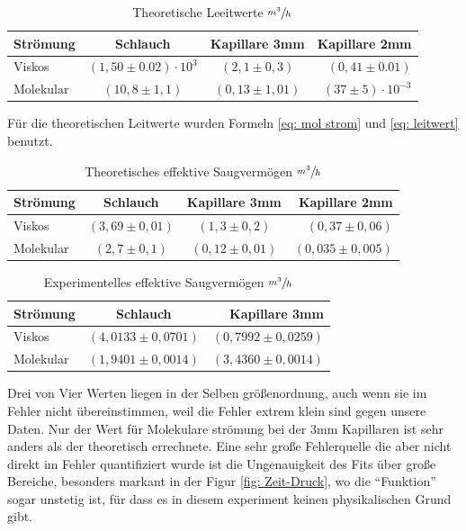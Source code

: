 \documentclass[12pt]{article}
\begin{document}
		\begin{table} [H]
			\begin{center}
				\caption{Theoretische Leeitwerte $\sfrac{m^3}{h}$}
				\begin{tabular}{l|c|c|r}
					\textbf{Strömung } & \textbf{Schlauch}  & \textbf{Kapillare 3mm} & \textbf{Kapillare 2mm}\\
					\hline
					Viskos    &	$(1,50\pm 0.02)\cdot 10^{3} $    & $ (2,1\pm 0,3 )$ & $ (0,41\pm 0.01 )$\\
					Molekular & $ (10,8\pm1,1 )$ & $ (0,13\pm 1,01 )$ & $ (37\pm 5 )\cdot 10^{-3}$\\
				\end{tabular}
			\end{center}
		\end{table}
	Für die theoretischen Leitwerte wurden Formeln \ref{eq: mol strom} und \ref{eq: leitwert} benutzt.
	
		\begin{table} [H]
			\begin{center}
				\caption{Theoretisches effektive Saugvermögen $\sfrac{m^3}{h}$ }
				\begin{tabular}{l|c|c|r}
					\textbf{Strömung } & \textbf{Schlauch}  & \textbf{Kapillare 3mm} & \textbf{Kapillare 2mm}\\
					\hline
					Viskos    &	$( 3,69\pm 0,01)$ & $(1,3 \pm 0,2 )$ & $( 0,37\pm 0,06)$\\
					Molekular &	$( 2,7\pm 0,1 )$ & $(0,12 \pm 0,01 )$ & $( 0,035\pm 0,005)$\\
				\end{tabular}
			\end{center}
		\end{table}
		\begin{table} [H]
			\begin{center}
				\caption{Experimentelles effektive Saugvermögen $\sfrac{m^3}{h}$ }
				\begin{tabular}{l|c|r}
					\textbf{Strömung } & \textbf{Schlauch}  & \textbf{Kapillare 3mm} \\
					\hline
					Viskos    &	$( 4,0133 \pm 0,0701)$ & $( 0,7992\pm 0,0259 )$ \\
					Molekular &	$( 1,9401 \pm 0,0014)$ & $( 3,4360\pm 0,0014)$ \\
				\end{tabular}
			\end{center}
		\end{table}
	Drei von Vier Werten liegen in der Selben größenordnung, auch wenn sie im Fehler nicht übereinstimmen, weil die Fehler extrem klein sind gegen unsere Daten. Nur der Wert für Molekulare strömung bei der 3mm Kapillaren ist sehr anders als der theoretisch errechnete. Eine sehr große Fehlerquelle die aber nicht direkt im Fehler quantifiziert wurde ist die Ungenauigkeit des Fits über große Bereiche, besonders markant in der Figur \ref{fig: Zeit-Druck}, wo die “Funktion” sogar unstetig ist, für dass es in diesem experiment keinen physikalischen Grund gibt.
	
\end{document}
